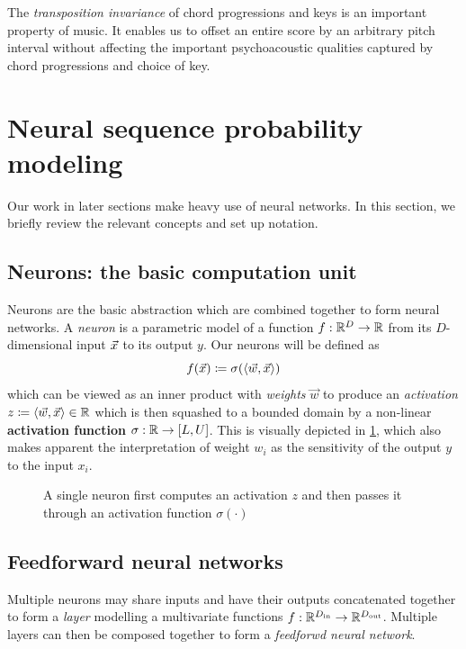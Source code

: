 The \emph{transposition invariance} of chord progressions and keys is an
important property of music. It enables us to offset an entire score by an
arbitrary pitch interval without affecting the important psychoacoustic
qualities captured by chord progressions and choice of key.

\section{Neural sequence probability modeling}

Our work in later sections make heavy use of neural networks. In this section,
we briefly review the relevant concepts and set up notation.

\subsection{Neurons: the basic computation unit}

Neurons are the basic abstraction which are combined together to form
neural networks. A \emph{neuron} is a parametric model of a function $f : \mathbb{R}^D \to
\mathbb{R}$ from its $D$-dimensional input $\vec{x}$ to its output $y$. Our neurons will be
defined as
\begin{equation}
    f(\vec{x}) \coloneqq \sigma( \langle \vec{w}, \vec{x} \rangle)
\end{equation}
which can be viewed as an inner product with \emph{weights} $\vec{w}$ to
produce an \emph{activation} $z \coloneqq \langle \vec{w}, \vec{x} \rangle
\in \mathbb{R}$ which is then squashed to a bounded domain by a non-linear
\textbf{activation function} $\sigma : \mathbb{R} \to [L, U]$. This is visually
depicted in \cref{fig:nn-single}, which also makes apparent the
interpretation of weight $w_i$ as the sensitivity of the output $y$ to the
input $x_i$.

\begin{figure}[htpb]
    \centering
    
    \caption{A single neuron first computes an activation $z$ and then passes it through an activation function $\sigma(\cdot)$}
    \label{fig:nn-single}
\end{figure}

\subsection{Feedforward neural networks}

Multiple neurons may share inputs and have their outputs concatenated together
to form a \emph{layer} modelling a multivariate functions $f :
\mathbb{R}^{D_\text{in}} \to \mathbb{R}^{D_\text{out}}$. Multiple layers can then
be composed together to form a \emph{feedforwd neural network}.

